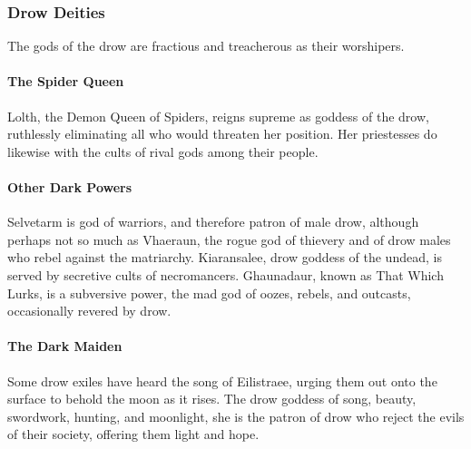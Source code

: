 \documentclass[10pt,a4paper,twoside,twocolumn,openany,bg=print,nodeprecatedcode]{dndbook}
\begin{document}
\subsubsection{Drow Deities}
The gods of the drow are fractious and treacherous as their worshipers.
\paragraph{The Spider Queen}
Lolth, the Demon Queen of Spiders, reigns supreme as goddess of the drow, ruthlessly eliminating all who would threaten her position. Her priestesses do likewise with the cults of rival gods among their people.
\paragraph{Other Dark Powers}
Selvetarm is god of warriors, and therefore patron of male drow, although perhaps not so much as Vhaeraun, the rogue god of thievery and of drow males who rebel against the matriarchy. Kiaransalee, drow goddess of the undead, is served by secretive cults of necromancers. Ghaunadaur, known as That Which Lurks, is a subversive power, the mad god of oozes, rebels, and outcasts, occasionally revered by drow.
\paragraph{The Dark Maiden}
Some drow exiles have heard the song of Eilistraee, urging them out onto the surface to behold the moon as it rises. The drow goddess of song, beauty, swordwork, hunting, and moonlight, she is the patron of drow who reject the evils of their society, offering them light and hope.
\end{document}
